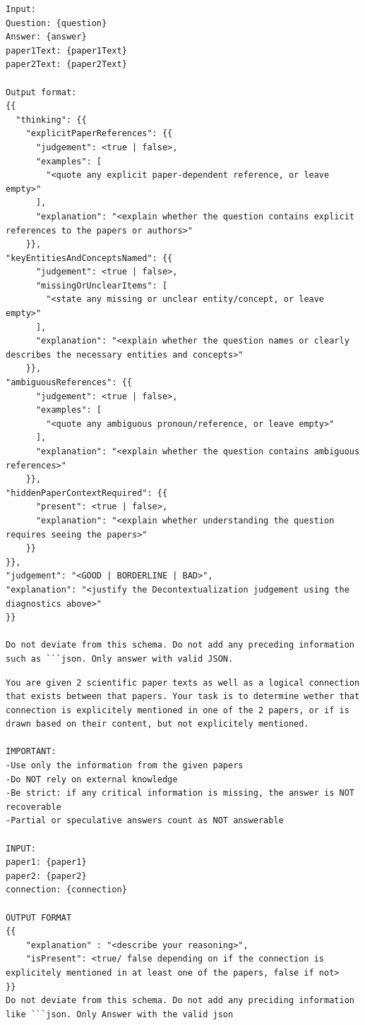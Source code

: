 \begin{lstlisting}[caption={decontextualization Prompt}, label={lst:decontextualizationPrompt}]
Input:
Question: {question}
Answer: {answer}
paper1Text: {paper1Text}
paper2Text: {paper2Text}

Output format:
{{
  "thinking": {{
    "explicitPaperReferences": {{
      "judgement": <true | false>,
      "examples": [
        "<quote any explicit paper-dependent reference, or leave empty>"
      ],
      "explanation": "<explain whether the question contains explicit references to the papers or authors>"
    }},
"keyEntitiesAndConceptsNamed": {{
      "judgement": <true | false>,
      "missingOrUnclearItems": [
        "<state any missing or unclear entity/concept, or leave empty>"
      ],
      "explanation": "<explain whether the question names or clearly describes the necessary entities and concepts>"
    }},
"ambiguousReferences": {{
      "judgement": <true | false>,
      "examples": [
        "<quote any ambiguous pronoun/reference, or leave empty>"
      ],
      "explanation": "<explain whether the question contains ambiguous references>"
    }},
"hiddenPaperContextRequired": {{
      "present": <true | false>,
      "explanation": "<explain whether understanding the question requires seeing the papers>"
    }}
}},
"judgement": "<GOOD | BORDERLINE | BAD>",
"explanation": "<justify the Decontextualization judgement using the diagnostics above>"
}}

Do not deviate from this schema. Do not add any preceding information such as ```json. Only answer with valid JSON.

\end{lstlisting}







\begin{lstlisting}[caption={DIRE prompt}, label={lst:DIRE prompt}]
You are given 2 scientific paper texts as well as a logical connection that exists between that papers. Your task is to determine wether that connection is explicitely mentioned in one of the 2 papers, or if is drawn based on their content, but not explicitely mentioned. 

IMPORTANT:
-Use only the information from the given papers
-Do NOT rely on external knowledge
-Be strict: if any critical information is missing, the answer is NOT recoverable
-Partial or speculative answers count as NOT answerable

INPUT:
paper1: {paper1}
paper2: {paper2}
connection: {connection}

OUTPUT FORMAT
{{
    "explanation" : "<describe your reasoning>",
    "isPresent": <true/ false depending on if the connection is explicitely mentioned in at least one of the papers, false if not>
}}
Do not deviate from this schema. Do not add any preciding information like ```json. Only Answer with the valid json
\end{lstlisting}



